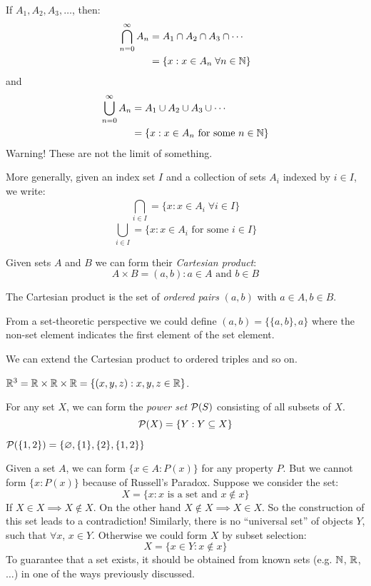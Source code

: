 \documentclass[../main.tex]{subfiles}
\begin{document}
\begin{remark}[Notation]
  If $A_1, A_2, A_3, \ldots$, then:
  \begin{align*}
    \bigcap_{n=0}^{\infty} A_n &= A_1 \cap A_2 \cap A_3 \cap \cdots \\
                               &= \{x: x \in A_n\;\forall n \in \mathbb{N}\}
  \end{align*}
  and
  \begin{align*}
    \bigcup_{n=0}^{\infty} A_n &= A_1 \cup A_2 \cup A_3 \cup \cdots \\
                               &= \{x: x \in A_n \text{ for some } n \in \mathbb{N}\}
  \end{align*}
  Warning! These are not the limit of something.

  More generally, given an index set $I$ and a collection of sets $A_i$ indexed by $i \in I$, we write:
  \[
    \bigcap_{i \in I}^{} = \{x: x \in A_i\;\forall i \in I\}
  \]
  \[
    \bigcup_{i \in I}^{} = \{x: x \in A_i \text{ for some } i \in I\}
  \]
\end{remark}
\begin{definition}
  Given sets $A$ and $B$ we can form their \textit{Cartesian product}:
  \[
    A \times B = {(a, b): a \in A \text{ and } b \in B}
  \]
\end{definition}
The Cartesian product is the set of \textit{ordered pairs} $(a, b)$ with $a \in A, b \in B$.
\begin{remark}
From a set-theoretic perspective we could define $(a, b) = \{\{a, b\}, a\}$ where the non-set element indicates the first element of the set element.
\end{remark}

We can extend the Cartesian product to ordered triples and so on.
\begin{example}
  $\mathbb{R}^3 = \mathbb{R} \times \mathbb{R} \times \mathbb{R} = \{(x, y, z) : x, y, z \in \mathbb{R}\}$.
\end{example}
\begin{definition}
  For any set $X$, we can form the \textit{power set} $\mathcal{P}(S)$ consisting of all subsets of $X$.
  \[
    \mathcal{P}(X) = \{Y: Y \subseteq X\}
  \]
\end{definition}
\begin{example}
  $\mathcal{P}(\{1, 2\}) = \{ \varnothing, \{1\}, \{2\}, \{1, 2\}\}$
\end{example}
\begin{remark}[Warning]
  Given a set $A$, we can form $\{x \in A: P(x)\}$ for any property $P$.
  But we cannot form $\{x: P(x)\}$ because of Russell's Paradox. Suppose we consider the set:
  \[
    X = \{x: x \text{ is a set and } x \notin x\}
  \]
  If $X \in X \implies X \notin X$.
  On the other hand $X \notin X \implies X \in X$.
  So the construction of this set leads to a contradiction!
  Similarly, there is no ``universal set'' of objects $Y$, such that $\forall x$, $x \in Y$.
  Otherwise we could form $X$ by subset selection:
  \[
    X = \{x \in Y: x \notin x\}
  \]
  To guarantee that a set exists, it should be obtained from known sets (e.g. $\mathbb{N}$, $\mathbb{R}$, $\ldots$) in one of the ways previously discussed.
\end{remark}
\end{document}
